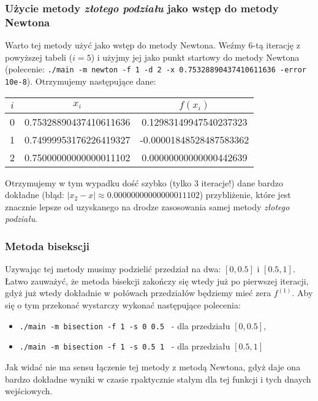 \documentclass[a4paper,11pt]{article}
\begin{document}
    \subsubsection{Użycie metody \emph{złotego podziału} jako wstęp do metody Newtona}
    Warto tej metody użyć jako wstęp do metody Newtona. Weźmy 6-tą iterację z powyższej tabeli ($ i = 5 $) i użyjmy jej jako punkt startowy do metody Newtona (polecenie: \texttt{./main -m newton -f 1 -d 2 -x 0.75328890437410611636 -error 10e-8}). Otrzymujemy następujące dane:
     \begin{center}
      \begin{tabular}{S[table-format=1.0]S[table-format=-1.9]S[table-format=-1.15,table-auto-round=false]}
        \toprule
        {$i$}                & {$x_i$}               & {$f(x_i)$}            \\  & 0.75328890437410611636 & 0.12983149947540237323 \\
         1 & 0.74999953176226419327 & -0.00001848528487583362 \\
         2 & 0.75000000000000011102 & 0.00000000000000442639 \\ \bottomrule
      \end{tabular}
    \end{center}
  Otrzymujemy w tym wypadku dość szybko (tylko 3 iteracje!) dane bardzo dokładne (błąd: $ |x_2 - x| \approx 0.00000000000000011102 $) przybliżenie, które jest znacznie lepsze od uzyskanego na drodze zasosowania samej metody \emph{złotego podziału}. 
    
  \subsubsection{Metoda bisekscji}
  Uzywając tej metody musimy podzielić przedział na dwa: $ [0, 0.5] $ i $ [0.5, 1]$. Łatwo zauważyć, że metoda bisekcji zakończy się wtedy już po pierwszej iteracji, gdyż już wtedy dokładnie w połówach przedziałów będziemy mieć zera $f^{(1)}$. Aby się o tym przekonać wystarczy wykonać następujące polecenia:
  \begin{itemize}
    \item \texttt{./main -m bisection -f 1 -s 0 0.5 } - dla przedziału $[0, 0.5]$,
    \item \texttt{./main -m bisection -f 1 -s 0.5 1 } - dla przedziału $[0.5, 1]$
  \end{itemize}
  Jak widać nie ma sensu łączenie tej metody z metodą Newtona, gdyż daje ona bardzo dokładne wyniki w czasie rpaktycznie stałym dla tej funkcji i tych dnaych wejściowych.
      
\end{document}
